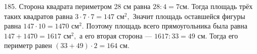 185. Сторона квадрата периметром 28 см равна $28:4=7$см. Тогда площадь трёх таких квадратов равна $3\cdot7\cdot7=147\text{ см}^2,$ Значит площадь оставшейся фигуры равна $147\cdot10=1470\text{ см}^2.$ Поэтому площадь всего прямоугольника была равна $147+1470=1617\text{ см}^2,$ а его вторая сторона --- $1617:33=49$ см. Тогда его периметр равен $(33+49)\cdot2=164$ см.\\
